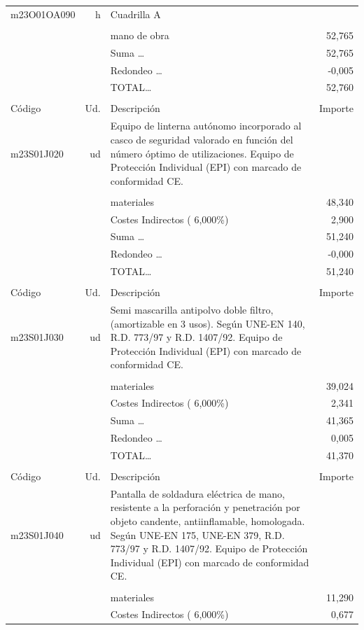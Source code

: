 \documentclass{book}%
\begin{document}
\begin{supertabular}{l r p{60mm} r}
\hline%
m23O01OA090&h&Cuadrilla A&\\%
&&&\\%
&&mano de obra&    52,765\\%
&&Suma \ldots&    52,765\\%
&&Redondeo \ldots&    {-}0,005\\%
%
&&TOTAL\ldots&    52,760\\%
&&&\\%
Código&Ud.&Descripción&Importe\\%
\hline%
m23S01J020&ud&Equipo de linterna autónomo incorporado al casco de seguridad valorado en función del número óptimo de utilizaciones. Equipo de Protección Individual (EPI) con marcado de conformidad CE.&\\%
&&&\\%
&&materiales&    48,340\\%
&&Costes Indirectos (     6,000\%)&     2,900\\%
&&Suma \ldots&    51,240\\%
&&Redondeo \ldots&    {-}0,000\\%
%
&&TOTAL\ldots&    51,240\\%
&&&\\%
Código&Ud.&Descripción&Importe\\%
\hline%
m23S01J030&ud&Semi mascarilla antipolvo doble filtro, (amortizable en 3 usos). Según UNE{-}EN 140, R.D. 773/97 y R.D. 1407/92. Equipo de Protección Individual (EPI) con marcado de conformidad CE.&\\%
&&&\\%
&&materiales&    39,024\\%
&&Costes Indirectos (     6,000\%)&     2,341\\%
&&Suma \ldots&    41,365\\%
&&Redondeo \ldots&     0,005\\%
%
&&TOTAL\ldots&    41,370\\%
&&&\\%
Código&Ud.&Descripción&Importe\\%
\hline%
m23S01J040&ud&Pantalla de soldadura eléctrica de mano, resistente a la perforación y penetración por objeto candente, antiinflamable, homologada. Según UNE{-}EN 175, UNE{-}EN 379, R.D. 773/97 y R.D. 1407/92. Equipo de Protección Individual (EPI) con marcado de conformidad CE.&\\%
&&&\\%
&&materiales&    11,290\\%
&&Costes Indirectos (     6,000\%)&     0,677\\%

\end{supertabular}
\end{document}
